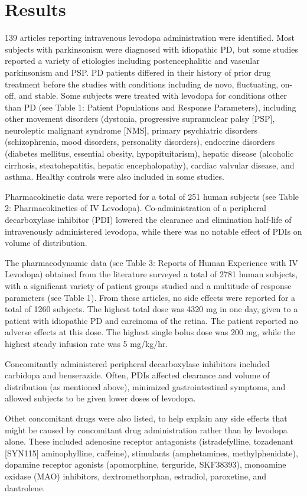 \section{Results}
139 articles reporting intravenous levodopa administration were identified.  Most subjects with parkinsonism were diagnosed with idiopathic PD, but some studies reported a variety of etiologies including postencephalitic and vascular parkinsonism and PSP.  PD patients differed in their history of prior drug treatment before the studies with conditions including de novo, fluctuating, on-off, and stable.  Some subjects were treated with levodopa for conditions other than PD (see Table 1: Patient Populations and Response Parameters), including other movement disorders (dystonia, progressive supranuclear palsy [PSP], neuroleptic malignant syndrome [NMS], primary psychiatric disorders (schizophrenia, mood disorders, personality disorders),  endocrine disorders (diabetes mellitus, essential obesity, hypopituitarism), hepatic disease (alcoholic cirrhosis, steatohepatitis, hepatic encephalopathy), cardiac valvular disease, and asthma.  Healthy controls were also included in some studies.

Pharmacokinetic data were reported for a total of 251 human subjects (see Table 2: Pharmacokinetics of IV Levodopa).  Co-administration of a peripheral decarboxylase inhibitor (PDI) lowered the clearance and elimination half-life of intravenously administered levodopa, while there was no notable effect of PDIs on volume of distribution.

The pharmacodynamic data (see Table 3: Reports of Human Experience with IV Levodopa) obtained from the literature  surveyed a total of 2781 human subjects, with a significant variety of patient groups studied and a multitude of response parameters (see Table 1).  From these articles, no side effects were reported for a total of 1260 subjects.  The highest total dose was 4320 mg in one day, given to a patient with idiopathic PD and carcinoma of the retina.  The patient reported no adverse effects at this dose.  The highest single bolus dose was 200 mg, while the highest steady infusion rate was 5 mg/kg/hr.

Concomitantly administered peripheral decarboxylase inhibitors included carbidopa and benserazide.  Often, PDIs affected clearance and volume of distribution (as mentioned above), minimized gastrointestinal symptoms, and allowed subjects to be given lower doses of levodopa.    

Othet concomitant drugs were also listed, to help explain any side effects that might be caused by concomitant drug administration rather than by levodopa alone.  These included adenosine receptor antagonists (istradefylline, tozadenant [SYN115] aminophylline, caffeine), stimulants (amphetamines, methylphenidate), dopamine receptor agonists (apomorphine, terguride, SKF38393), monoamine oxidase (MAO) inhibitors, dextromethorphan, estradiol, paroxetine, and dantrolene.  

